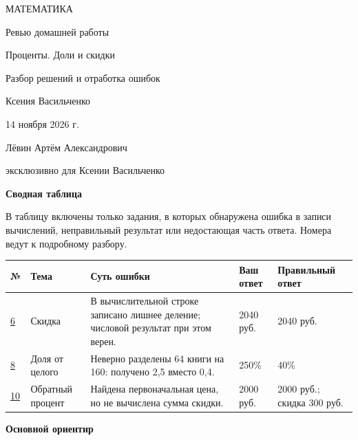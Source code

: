 \documentclass[a4paper,10pt]{article}
\newcommand{\sectionline}{\par\vspace{2pt}{\color{accent}\hrule height 0.45pt}\vspace{6pt}}
\begin{document}
\hypersetup{pageanchor=false}
\thispagestyle{empty}
\begin{titlepage}
\centering
\vspace*{25mm}
{\normalsize\color{darkaccent} МАТЕМАТИКА\par}
\vspace{21mm}
{\LARGE Ревью домашней работы\par}
\vspace{12mm}
{\Large\color{accent} Проценты. Доли и скидки\par}
\vspace{9mm}
{\normalsize Разбор решений и отработка ошибок\par}
\vfill
{\normalsize Ксения Васильченко\par}
\vspace{10mm}
{\normalsize 14 ноября 2026 г.\par}
\vspace{14mm}
{\small Лёвин Артём Александрович\par}
{\small эксклюзивно для Ксении Васильченко\par}
\vspace{20mm}
\end{titlepage}
\hypersetup{pageanchor=true}

\newpage
{\Large\color{darkaccent}\bfseries Сводная таблица}\sectionline
В таблицу включены только задания, в которых обнаружена ошибка в записи вычислений, неправильный результат или недостающая часть ответа. Номера ведут к подробному разбору.
\par\vspace{6pt}
{\small
\renewcommand{\arraystretch}{1.35}
\begin{tabularx}{\linewidth}{@{}p{12mm}p{23mm}X p{25mm}p{28mm}@{}}
\toprule
\textbf{№} & \textbf{Тема} & \textbf{Суть ошибки} & \textbf{Ваш ответ} & \textbf{Правильный ответ} \\
\midrule
\hyperref[task:6]{6} & Скидка & В вычислительной строке записано лишнее деление; числовой результат при этом верен. & 2040 руб. & 2040 руб. \\
\hyperref[task:8]{8} & Доля от целого & Неверно разделены 64 книги на 160: получено 2,5 вместо 0,4. & 250\% & 40\% \\
\hyperref[task:10]{10} & Обратный процент & Найдена первоначальная цена, но не вычислена сумма скидки. & 2000 руб. & 2000 руб.; скидка 300 руб. \\
\bottomrule
\end{tabularx}
}
\par\vspace{12pt}
{\color{darkaccent}\bfseries Основной ориентир}
\end{document}
